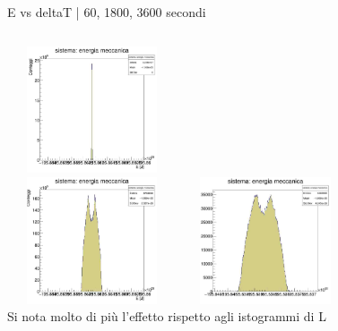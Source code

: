         \begin{frame}{E vs deltaT | 60, 1800, 3600 secondi}
            \begin{columns}
                    \centering        
                    \includegraphics[width=5cm,height=3.75cm]{4_energia/E_100_60.jpg}\\
                    \includegraphics[width=5cm,height=3.75cm]{4_energia/E_500_1800.jpg}
                    \label{cfr::E3}              
                    \centering        
                    \includegraphics[width=5cm,height=3.75cm]{4_energia/E_500_3600.jpg}\\
                    \label{cfr::E2T}
                    Si nota molto di più l'effetto rispetto agli istogrammi di L
            \end{columns}            
        \end{frame}
